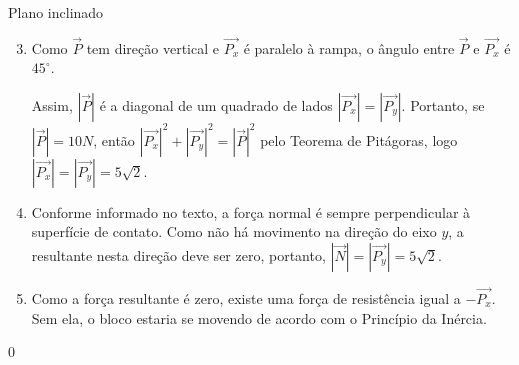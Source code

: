 \begin{answer}{Plano inclinado}
{
\begin{enumerate}\setcounter{enumi}{2}
\item {} 
Como \(\vec{P}\) tem direção vertical e \(\vec{P_x}\) é paralelo à rampa, o ângulo entre \(\vec{P}\) e \(\vec{P_x}\) é \(45^{\circ}\).


\begin{figure}[H]
\centering

\end{figure}


Assim, \(|\vec{P}|\) é a diagonal de um quadrado de lados \(|\vec{P_x}| = |\vec{P_y}|\). Portanto, se \(|\vec{P}| = 10N\), então \(|\vec{P_x}|^2 + |\vec{P_y}|^2 = |\vec{P}|^2\) pelo Teorema de Pitágoras, logo \(|\vec{P_x}| = |\vec{P_y}| = 5\sqrt{2}\).

\item {} 
Conforme informado no texto, a força normal é sempre perpendicular à superfície de contato. Como não há movimento na direção do eixo \(y\), a resultante nesta direção deve ser zero, portanto, \(|\vec{N}|=|\vec{P_y}|=5\sqrt{2}\).

\item {} 
Como a força resultante é zero, existe uma força de resistência igual a \(-\vec{P_x}\). Sem ela, o bloco estaria se movendo de acordo com o Princípio da Inércia.
\end{enumerate}
}{0}
\end{answer}

